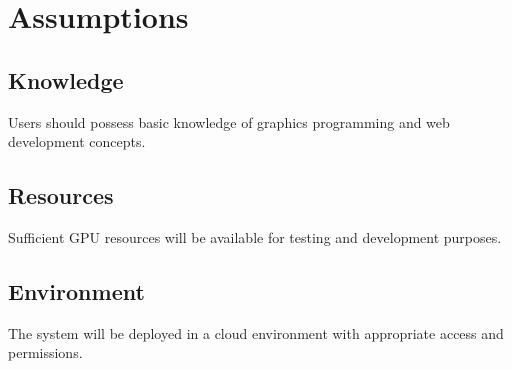 
\chapter{Assumptions} %

\label{Chapter4} %




\section{Knowledge}

Users should possess basic knowledge of graphics programming and web development concepts.


\section{Resources}

Sufficient GPU resources will be available for testing and development purposes.

\section{Environment}

The system will be deployed in a cloud environment with appropriate access and permissions.
